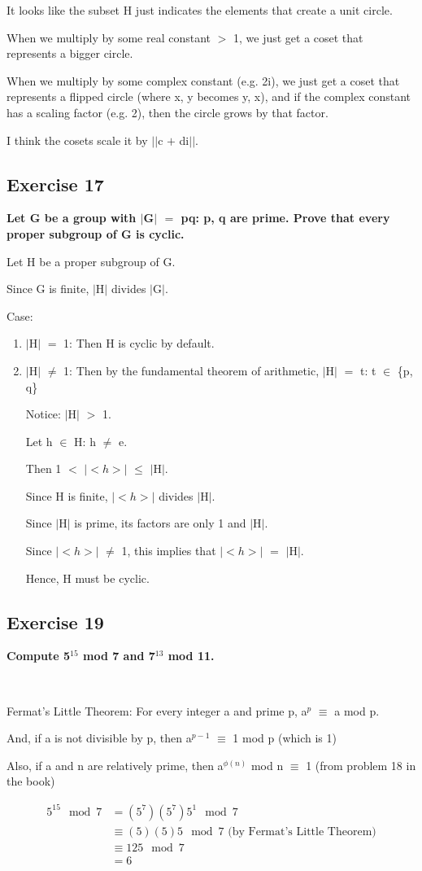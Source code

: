 \documentclass{article}
\newcommand{\mt}[1]{\ensuremath{#1}}
\newcommand\ssc[2][\DefaultOpt]{%
  \def\DefaultOpt{#2}%
  \subsection[#1]{#2}%
}
\newcommand{\elist}{\end{enumerate}}
\newcommand{\bilist}{\begin{enumerate}[label=\roman*)]}
\newcommand{\mem}{\mt{\in} }
\newcommand{\av}[1]{\mt{|}#1\mt{|}}  %
\newcommand{\bk}[1]{\{#1\}}
\newcommand{\ps}{\mt{+} }
\newcommand{\ls}{\mt{<} }
\newcommand{\gr}{\mt{>} }
\newcommand{\lse}{\mt{\leq} }
\newcommand{\eql}{\mt{=} }
\newcommand{\uf}[2]{#1\mt{^{#2}}}
\newcommand{\eqn}[1]{\[#1\]}
\newcommand{\splt}[1]{\begin{split}#1\end{split}}
\begin{document}
{{It looks like the subset H just indicates the elements that create a unit circle.

When we multiply by some real constant \gr 1, we just get a coset that represents a bigger circle.

When we multiply by some complex constant (e.g. 2i), we just get a coset that represents a flipped circle (where x, y becomes y, x), and if the complex constant has a scaling factor (e.g. 2), then the circle grows by that factor.

I think the cosets scale it by \av{\av{c \ps di}}.


}
\ssc{Exercise 17}{

\textbf{Let G be a group with \av{G} \eql pq: p, q are prime. Prove that every proper subgroup of G is cyclic.}

Let H be a proper subgroup of G.

Since G is finite, \av{H} divides \av{G}.

Case:
\bilist
\item \av{H} \eql 1: Then H is cyclic by default.
\item \av{H} $\neq$ 1: Then by the fundamental theorem of arithmetic, \av{H} \eql t: t \mem \bk{p, q}

Notice: \av{H} \gr 1.

Let h \mem H: h $\neq$ e.

Then 1 \ls \av{$<h>$} \lse \av{H}.

Since H is finite, \av{$<h>$} divides \av{H}.

Since \av{H} is prime, its factors are only 1 and \av{H}. 

Since \av{$<h>$} $\neq$ 1, this implies that \av{$<h>$} \eql \av{H}.

Hence, H must be cyclic.

\elist

}
\ssc{Exercise 19}{

\textbf{Compute \uf{5}{15} mod 7 and \uf{7}{13} mod 11.}

\

Fermat's Little Theorem: For every integer a and prime p, \uf{a}{p} $\equiv$ a mod p.

And, if a is not divisible by p, then \uf{a}{p - 1} $\equiv$ 1 mod p (which is 1)

Also, if a and n are relatively prime, then \uf{a}{\phi(n)} mod n $\equiv$ 1 (from problem 18 in the book)

\eqn{
	\splt{
		5^{15}\mod 7 & \eql (5^7)(5^7)5^1 \mod 7 \\
		& \equiv (5)(5)5 \mod 7 \textrm{ (by Fermat's Little Theorem)} \\
		& \equiv 125 \mod 7 \\
		& = 6
	}
}

}}
\end{document}
